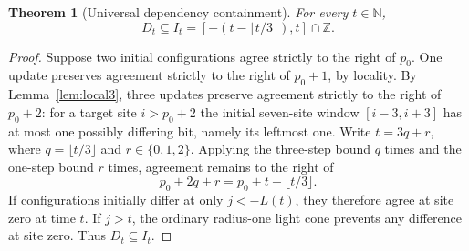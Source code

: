 \documentclass[11pt,a4paper]{article}
\newtheorem{theorem}{Theorem}[section]
\theoremstyle{definition}
\theoremstyle{remark}
\newcommand{\Z}{\mathbb{Z}}
\newcommand{\N}{\mathbb{N}}
\begin{document}
\begin{theorem}[Universal dependency containment]\label{thm:upper}
For every $t\in\N$,
\[
 D_t\subseteq I_t=[-(t-\lfloor t/3\rfloor),t]\cap\Z.
\]
\end{theorem}
\begin{proof}
Suppose two initial configurations agree strictly to the right of $p_0$. One update preserves agreement strictly to the right of $p_0+1$, by locality. By Lemma~\ref{lem:local3}, three updates preserve agreement strictly to the right of $p_0+2$: for a target site $i>p_0+2$ the initial seven-site window $[i-3,i+3]$ has at most one possibly differing bit, namely its leftmost one. Write $t=3q+r$, where $q=\lfloor t/3\rfloor$ and $r\in\{0,1,2\}$. Applying the three-step bound $q$ times and the one-step bound $r$ times, agreement remains to the right of
\[
 p_0+2q+r=p_0+t-\lfloor t/3\rfloor.
\]
If configurations initially differ at only $j<-L(t)$, they therefore agree at site zero at time $t$. If $j>t$, the ordinary radius-one light cone prevents any difference at site zero. Thus $D_t\subseteq I_t$.
\end{proof}
\end{document}
